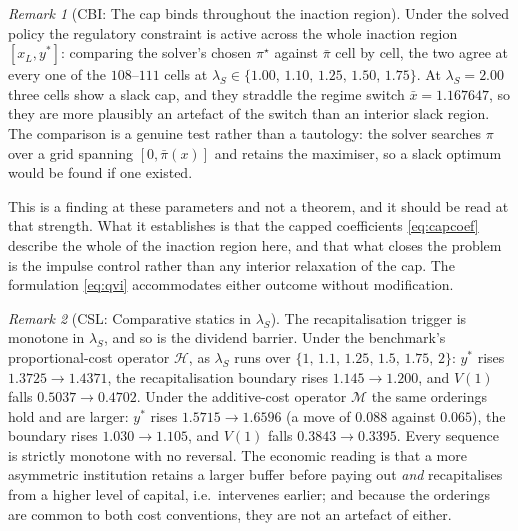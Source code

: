 \documentclass[11pt]{article}
\theoremstyle{remark}
\newtheorem{remark}{Remark}
\begin{document}
\begin{remark}[CBI: The cap binds throughout the inaction region]
\label{rem:capbinds}
Under the solved policy the regulatory constraint is active across the
whole inaction region $[x_L, y^*]$: comparing the solver's chosen
$\pi^\star$ against $\bar\pi$ cell by cell, the two agree at every one of
the $108$--$111$ cells at $\lambda_S \in
\{1.00,\,1.10,\,1.25,\,1.50,\,1.75\}$. At $\lambda_S=2.00$ three cells
show a slack cap, and they straddle the regime switch
$\bar x = 1.167647$, so they are more plausibly an artefact of the switch
than an interior slack region. The comparison is a genuine test rather
than a tautology: the solver searches $\pi$ over a grid spanning
$[0,\bar\pi(x)]$ and retains the maximiser, so a slack optimum would be
found if one existed.

This is a finding at these parameters and not a theorem, and it should be
read at that strength. What it establishes is that the capped
coefficients \eqref{eq:capcoef} describe the whole of the inaction region
here, and that what closes the problem is the impulse control rather than
any interior relaxation of the cap. The formulation \eqref{eq:qvi}
accommodates either outcome without modification.
\end{remark}

\begin{remark}[CSL: Comparative statics in $\lambda_S$]
\label{rem:compstat}
The recapitalisation trigger is monotone in $\lambda_S$, and so is the
dividend barrier. Under the benchmark's proportional-cost operator
$\mathcal{H}$, as $\lambda_S$ runs over
$\{1,\,1.1,\,1.25,\,1.5,\,1.75,\,2\}$: $y^*$ rises
$1.3725 \to 1.4371$, the recapitalisation boundary rises
$1.145 \to 1.200$, and $V(1)$ falls $0.5037 \to 0.4702$. Under the
additive-cost operator $\mathcal{M}$ the same orderings hold and are
larger: $y^*$ rises $1.5715 \to 1.6596$ (a move of $0.088$ against
$0.065$), the boundary rises $1.030 \to 1.105$, and $V(1)$ falls
$0.3843 \to 0.3395$. Every sequence is strictly monotone with no
reversal. The economic reading is that a more asymmetric institution
retains a larger buffer before paying out \emph{and} recapitalises from a
higher level of capital, i.e.\ intervenes earlier; and because the
orderings are common to both cost conventions, they are not an artefact
of either.
\end{remark}
\end{document}
